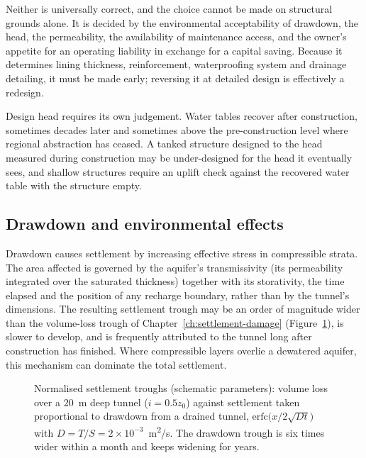 Neither is universally correct, and the choice cannot be made on structural
grounds alone. It is decided by the environmental acceptability of drawdown,
the head, the permeability, the availability of maintenance access, and the
owner's appetite for an operating liability in exchange for a capital saving.
Because it determines lining thickness, reinforcement, waterproofing system
and drainage detailing, it must be made early; reversing it at detailed design
is effectively a redesign.

Design head requires its own judgement. Water tables recover after
construction, sometimes decades later and sometimes above the pre-construction
level where regional abstraction has ceased. A tanked structure designed to
the head measured during construction may be under-designed for the head it
eventually sees, and shallow structures require an uplift check against the
recovered water table with the structure empty.

\subsection{Drawdown and environmental effects}
\label{sec:drawdown}

Drawdown causes settlement by increasing effective stress in compressible
strata. The area affected is governed by the aquifer's transmissivity
(its permeability integrated over the saturated thickness) together with
its storativity, the time elapsed and the position of any recharge boundary,
rather than by the tunnel's dimensions. The resulting settlement trough may be
an order of magnitude wider than the volume-loss trough of
Chapter~\ref{ch:settlement-damage} (Figure~\ref{fig:drawdown-trough}), is slower to develop, and is frequently
attributed to the tunnel long after construction has finished. Where
compressible layers overlie a dewatered aquifer, this mechanism can dominate
the total settlement.

\begin{figure}[htbp]
\centering
{}
\caption{Normalised settlement troughs (schematic parameters): volume loss over a 20~m deep tunnel ($i = 0.5z_0$) against settlement taken proportional to drawdown from a drained tunnel, $\mathrm{erfc}\bigl(x/2\sqrt{Dt}\bigr)$ with $D = T/S = 2\times10^{-3}$~m\textsuperscript{2}/s. The drawdown trough is six times wider within a month and keeps widening for years.}
\label{fig:drawdown-trough}
\end{figure}

